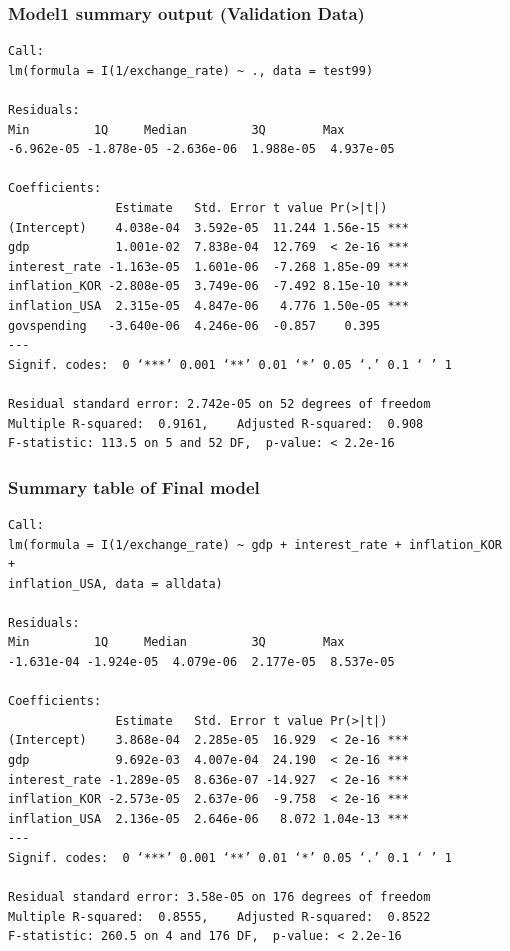 \documentclass[12pt]{article}
\begin{document}
\subsubsection{Model1 summary output (Validation Data)\label{m1:test}}

\begin{verbatim}
Call:
lm(formula = I(1/exchange_rate) ~ ., data = test99)

Residuals:
Min         1Q     Median         3Q        Max 
-6.962e-05 -1.878e-05 -2.636e-06  1.988e-05  4.937e-05 

Coefficients:
               Estimate   Std. Error t value Pr(>|t|)    
(Intercept)    4.038e-04  3.592e-05  11.244 1.56e-15 ***
gdp            1.001e-02  7.838e-04  12.769  < 2e-16 ***
interest_rate -1.163e-05  1.601e-06  -7.268 1.85e-09 ***
inflation_KOR -2.808e-05  3.749e-06  -7.492 8.15e-10 ***
inflation_USA  2.315e-05  4.847e-06   4.776 1.50e-05 ***
govspending   -3.640e-06  4.246e-06  -0.857    0.395    
---
Signif. codes:  0 ‘***’ 0.001 ‘**’ 0.01 ‘*’ 0.05 ‘.’ 0.1 ‘ ’ 1

Residual standard error: 2.742e-05 on 52 degrees of freedom
Multiple R-squared:  0.9161,	Adjusted R-squared:  0.908 
F-statistic: 113.5 on 5 and 52 DF,  p-value: < 2.2e-16
\end{verbatim}


\subsubsection{Summary table of Final model}

\label{finalmodel}
\begin{verbatim}
Call:
lm(formula = I(1/exchange_rate) ~ gdp + interest_rate + inflation_KOR + 
inflation_USA, data = alldata)

Residuals:
Min         1Q     Median         3Q        Max 
-1.631e-04 -1.924e-05  4.079e-06  2.177e-05  8.537e-05 

Coefficients:
               Estimate   Std. Error t value Pr(>|t|)    
(Intercept)    3.868e-04  2.285e-05  16.929  < 2e-16 ***
gdp            9.692e-03  4.007e-04  24.190  < 2e-16 ***
interest_rate -1.289e-05  8.636e-07 -14.927  < 2e-16 ***
inflation_KOR -2.573e-05  2.637e-06  -9.758  < 2e-16 ***
inflation_USA  2.136e-05  2.646e-06   8.072 1.04e-13 ***
---
Signif. codes:  0 ‘***’ 0.001 ‘**’ 0.01 ‘*’ 0.05 ‘.’ 0.1 ‘ ’ 1

Residual standard error: 3.58e-05 on 176 degrees of freedom
Multiple R-squared:  0.8555,	Adjusted R-squared:  0.8522 
F-statistic: 260.5 on 4 and 176 DF,  p-value: < 2.2e-16
\end{verbatim}
\end{document}
